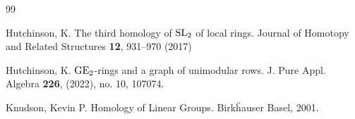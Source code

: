 \documentclass[11pt]{amsart}
\theoremstyle{definition}
\theoremstyle{plain}
\theoremstyle{definition}
\numberwithin{equation}{section}
\newcommand{\q}{\mathbb{Q}}
\newcommand{\GE}{{\rm GE}}
\newcommand{\SL}{\mathit{{\rm SL}}}
\begin{document}
\begin{thebibliography}{99}
		
		Hutchinson, K. The third homology of $\SL_2$ of local rings. Journal of Homotopy and Related Structures {\bf 12}, 931--970 (2017)
		
		Hutchinson, K. $\GE_2$-rings and a graph of unimodular rows. J. Pure Appl. Algebra {\bf 226}, (2022), no. 10, 107074.
		
		Knudson, Kevin P. Homology of Linear Groups. Birk\"hauser Basel, 2001.
		
		
		
		
		
		
		
		
		
		
		
		

\end{thebibliography}
\end{document}
